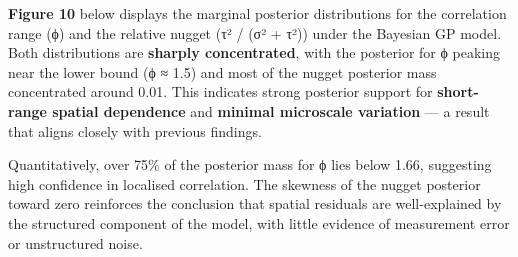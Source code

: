 \documentclass[
  11pt,
]{article}
\newenvironment{Shaded}{\begin{snugshade}}{\end{snugshade}}
\newcommand{\AttributeTok}[1]{\textcolor[rgb]{0.40,0.45,0.13}{#1}}
\newcommand{\CommentTok}[1]{\textcolor[rgb]{0.37,0.37,0.37}{#1}}
\newcommand{\DecValTok}[1]{\textcolor[rgb]{0.68,0.00,0.00}{#1}}
\newcommand{\FloatTok}[1]{\textcolor[rgb]{0.68,0.00,0.00}{#1}}
\newcommand{\FunctionTok}[1]{\textcolor[rgb]{0.28,0.35,0.67}{#1}}
\newcommand{\NormalTok}[1]{\textcolor[rgb]{0.00,0.23,0.31}{#1}}
\newcommand{\OtherTok}[1]{\textcolor[rgb]{0.00,0.23,0.31}{#1}}
\newcommand{\SpecialCharTok}[1]{\textcolor[rgb]{0.37,0.37,0.37}{#1}}
\newcommand{\StringTok}[1]{\textcolor[rgb]{0.13,0.47,0.30}{#1}}
\begin{document}
\textbf{Figure 10} below displays the marginal posterior distributions
for the correlation range (ϕ) and the relative nugget (τ² / (σ² + τ²))
under the Bayesian GP model. Both distributions are \textbf{sharply
concentrated}, with the posterior for ϕ peaking near the lower bound (ϕ
≈ 1.5) and most of the nugget posterior mass concentrated around 0.01.
This indicates strong posterior support for \textbf{short-range spatial
dependence} and \textbf{minimal microscale variation} --- a result that
aligns closely with previous findings.

Quantitatively, over 75\% of the posterior mass for ϕ lies below 1.66,
suggesting high confidence in localised correlation. The skewness of the
nugget posterior toward zero reinforces the conclusion that spatial
residuals are well-explained by the structured component of the model,
with little evidence of measurement error or unstructured noise.

\begin{Shaded}
\end{Shaded}
\end{document}
